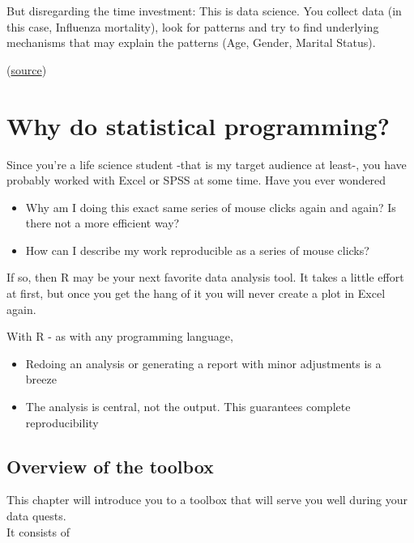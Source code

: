 \documentclass[]{book}
\providecommand{\tightlist}{%
  \setlength{\itemsep}{0pt}\setlength{\parskip}{0pt}}
\begin{document}
But disregarding the time investment: This is data science. You collect data (in this case, Influenza mortality), look for patterns and try to find underlying mechanisms that may explain the patterns (Age, Gender, Marital Status).

(\href{https://www.nytimes.com/2020/04/02/nyregion/spanish-flu-nyc-virus.html}{source})

\hypertarget{why-do-statistical-programming}{%
\section{Why do statistical programming?}\label{why-do-statistical-programming}}

Since you're a life science student -that is my target audience at least-, you have probably worked with Excel or SPSS at some time. Have you ever wondered

\begin{itemize}
\tightlist
\item
  Why am I doing this exact same series of mouse clicks again and again? Is there not a more efficient way?
\item
  How can I describe my work reproducible as a series of mouse clicks?
\end{itemize}

If so, then R may be your next favorite data analysis tool.
It takes a little effort at first, but once you get the hang of it you will never create a plot in Excel again.

With R - as with any programming language,

\begin{itemize}
\tightlist
\item
  Redoing an analysis or generating a report with minor adjustments is a breeze
\item
  The analysis is central, not the output. This guarantees complete reproducibility
\end{itemize}

\hypertarget{overview-of-the-toolbox}{%
\subsection*{Overview of the toolbox}\label{overview-of-the-toolbox}}

This chapter will introduce you to a toolbox that will serve you well during your data quests.\\
It consists of
\end{document}
